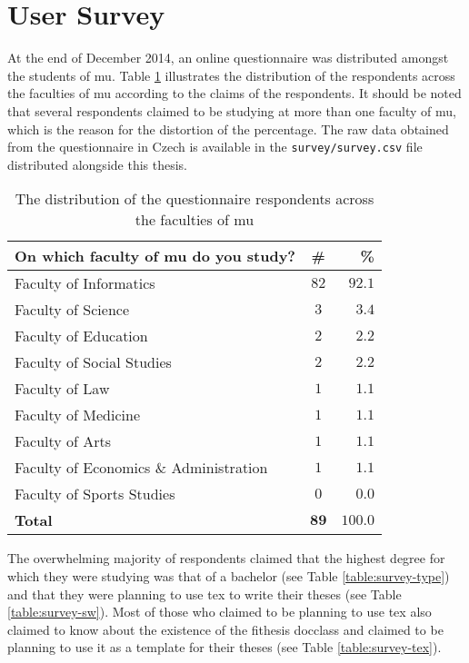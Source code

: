 \section{User Survey}
At the end of December 2014, an online questionnaire was distributed amongst the students of \gls{mu}. Table \ref{table:survey-faculty} illustrates the distribution of the respondents across the faculties of \gls{mu} according to the claims of the respondents. It should be noted that several respondents claimed to be studying at more than one faculty of \gls{mu}, which is the reason for the distortion of the percentage. The raw data obtained from the questionnaire in Czech is available in the \texttt{survey/survey.csv} file distributed alongside this thesis.

\begin{table}
  \caption{The distribution of the questionnaire respondents across the faculties of \acrshort{mu}}
  \begin{tabularx}{\textwidth}{Xcr}
    \textbf{On which faculty of \gls{mu} do you study?} & \textbf{\#} & \textbf{\%} \\
    \hline
    Faculty of Informatics                  & $82$          & $92.1$ \\
    Faculty of Science                      &  $3$          &  $3.4$ \\
    Faculty of Education                    &  $2$          &  $2.2$ \\
    Faculty of Social Studies               &  $2$          &  $2.2$ \\
    Faculty of Law                          &  $1$          &  $1.1$ \\
    Faculty of Medicine                     &  $1$          &  $1.1$ \\
    Faculty of Arts                         &  $1$          &  $1.1$ \\
    Faculty of Economics \& Administration  &  $1$          &  $1.1$ \\
    Faculty of Sports Studies               &  $0$          &  $0.0$ \\
    \hline
    \textbf{Total}                        & $\mathbf{89}$ & $\mathbf{100.0}$
  \end{tabularx}
  \label{table:survey-faculty}
\end{table}

The overwhelming majority of respondents claimed that the highest degree for which they were studying was that of a bachelor (see Table \ref{table:survey-type}) and that they were planning to use \gls{tex} to write their theses (see Table \ref{table:survey-sw}). Most of those who claimed to be planning to use \gls{tex} also claimed to know about the existence of the fithesis \gls{docclass} and claimed to be planning to use it as a template for their theses (see Table \ref{table:survey-tex}).

